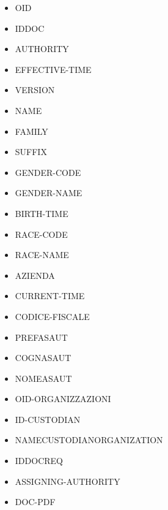 \begin{itemize}
    \setlength\itemsep{0.01em}
    \item OID
    \item IDDOC
    \item AUTHORITY
    \item EFFECTIVE-TIME
    \item VERSION
    \item NAME
    \item FAMILY
    \item SUFFIX
    \item GENDER-CODE
    \item GENDER-NAME
    \item BIRTH-TIME
    \item RACE-CODE
    \item RACE-NAME
    \item AZIENDA
    \item CURRENT-TIME
    \item CODICE-FISCALE
    \item PREFASAUT
    \item COGNASAUT
    \item NOMEASAUT
    \item OID-ORGANIZZAZIONI
    \item ID-CUSTODIAN
    \item NAMECUSTODIANORGANIZATION
    \item IDDOCREQ
    \item ASSIGNING-AUTHORITY
    \item DOC-PDF
\end{itemize}



